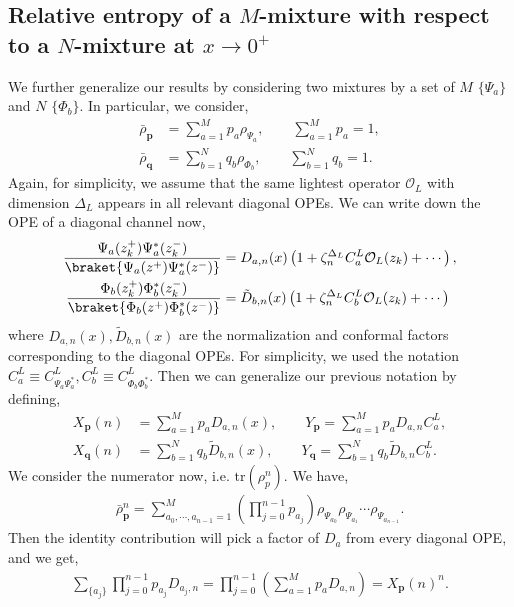 \documentclass[11pt]{article}
\newcommand{\mO}{\mathcal{O}}
\newcommand{\lb}{\left(}
\newcommand{\rb}{\right)}
\begin{document}
\subsection{
\texorpdfstring{
Relative entropy of a $M$-mixture with respect to a $N$-mixture at $x\to 0^+$
}{
Relative entropy of a M-mixture with respect to a N-mixture at x to 0+
}
}
We further generalize our results by considering two mixtures by a set of $M$ $\{\Psi_a\}$ and $N$ $\{\Phi_b\}$. In particular, we consider,
\begin{align}
    \bar{\rho}_\textbf{p} &= \sum_{a=1}^M p_a \rho_{\Psi_a}, \qquad \sum_{a=1}^M p_a = 1 ,\\
    \bar{\rho}_\textbf{q} &= \sum_{b=1}^N q_b \rho_{\Phi_b}, \qquad \sum_{b=1}^N q_b = 1 .
\end{align}
Again, for simplicity, we assume that the same lightest operator $\mO_L$ with dimension $\Delta_L$ appears in all relevant diagonal OPEs. 
We can write down the OPE of a diagonal channel now,
\begin{align}
    \frac{\Psi_a(z_k^+) \Psi_a^*(z_k^-)} {\braket {\Psi_a(z^+) \Psi_a^*(z^-)}}&= D_{a,n}(x) \lb 1 + \zeta_n^{\Delta_L}C_a^L\mO_L(z_k) + \cdots\rb,\\
    \frac{\Phi_b(z_k^+) \Phi_b^*(z_k^-)} {\braket {\Phi_b(z^+) \Phi_b^*(z^-)}}&= \tilde{D}_{b,n}(x) \lb 1 + \zeta_n^{\Delta_L}C_b^L\mO_L(z_k) + \cdots\rb
\end{align}
where $D_{a,n}(x), \tilde{D}_{b,n}(x)$ are the  normalization and conformal factors corresponding to the diagonal OPEs. For simplicity, we used the notation $C_a^L \equiv C_{\Psi_a\Psi_a^*}^L, C_b^L \equiv C_{\Phi_b\Phi_b^*}^L$. Then we can generalize our previous notation by defining,
\begin{align}
    X_\textbf{p}(n) &= \sum_{a=1}^Mp_a D_{a,n}(x), \qquad Y_\textbf{p} = \sum_{a=1}^M p_a D_{a,n} C_a^L,\\
    X_\textbf{q}(n) &= \sum_{b=1}^Nq_b \tilde{D}_{b,n}(x), \qquad Y_\textbf{q} = \sum_{b=1}^N q_b \tilde{D}_{b,n} C_b^L.
\end{align}
We consider the numerator now, i.e. $\text{tr}(\rho_p^n)$. 
We have,
\begin{align}
    \bar{\rho}_\textbf{p}^n = \sum_{a_0,\cdots, a_{n-1}=1}^M \lb \prod_{j=0}^{n-1}p_{a_j} \rb \rho_{\Psi_{a_0}} \rho_{\Psi_{a_1}} \cdots \rho_{\Psi_{a_{n-1}}}. 
\end{align}
Then the identity contribution will pick a factor of $D_a$ from every diagonal OPE, and we get,
\begin{align}
    \sum_{\{a_j\}} \prod_{j=0}^{n-1}p_{a_j} D_{a_j,n} = \prod_{j=0}^{n-1} \lb \sum_{a=1}^M  p_a D_{a,n}\rb = X_\textbf{p}(n)^n.
\end{align}
\end{document}
